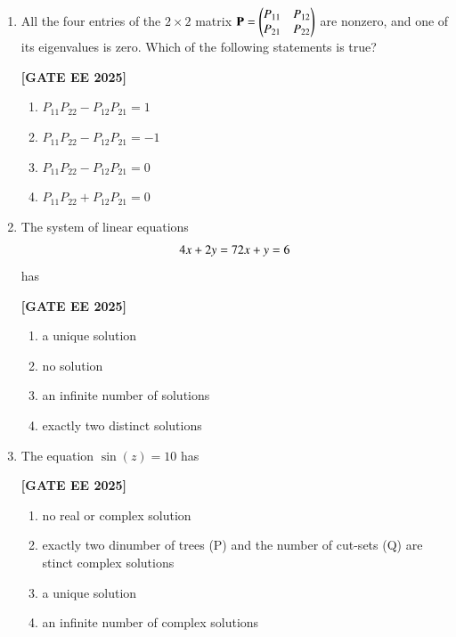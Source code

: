 \documentclass[12pt]{article}
\begin{document}
\begin{enumerate}[leftmargin=2.5em, label=\textbf{Q.\arabic*}., itemsep=2em]
\item All the four entries of the $2\times2$ matrix $\mathbf{P} = \begin{pmatrix}P_{11} & P_{12}\\ P_{21} & P_{22}\end{pmatrix}$ are nonzero, and one of its eigenvalues is zero. Which of the following statements is true?
 
\noindent \textbf{[GATE EE 2025]}
\begin{multicols}{2}
    \begin{enumerate}
        \item $P_{11}P_{22} - P_{12}P_{21} = 1$
        \item $P_{11}P_{22} - P_{12}P_{21} = -1$
        \item $P_{11}P_{22} - P_{12}P_{21} = 0$
        \item $P_{11}P_{22} + P_{12}P_{21} = 0$
    \end{enumerate}
\end{multicols}

\item The system of linear equations
\[
4x + 2y = 7 \\
2x + y = 6
\]
has
 
\noindent \textbf{[GATE EE 2025]}
\begin{multicols}{2}
    \begin{enumerate}
        \item a unique solution
        \item no solution
        \item an infinite number of solutions
        \item exactly two distinct solutions
    \end{enumerate}
\end{multicols}

\item The equation $\sin(z) = 10$ has
 
\noindent \textbf{[GATE EE 2025]}
    \begin{enumerate}
        \item no real or complex solution
        \item exactly two dinumber of trees (P) and the number of cut-sets (Q) are
stinct complex solutions
        \item a unique solution
        \item an infinite number of complex solutions
    \end{enumerate}


\end{enumerate}
\end{document}
